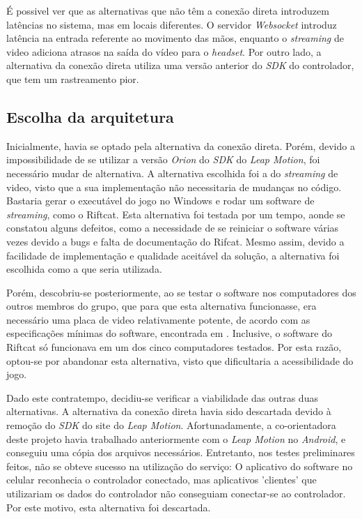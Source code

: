 \begin{quadro}[htb]
	\legend{\fonteAP}
\label{tabela:alternativas-arquiteturas}
\end{quadro}

É possivel ver que as alternativas que não têm a conexão direta introduzem latências no sistema, mas em locais diferentes. O servidor \textit{Websocket} introduz latência na entrada referente ao movimento das mãos, enquanto o \textit{streaming} de video adiciona atrasos na saída do vídeo para o \textit{headset}. Por outro lado, a alternativa da conexão direta utiliza uma versão anterior do \textit{SDK} do controlador, que tem um rastreamento pior.

\subsection{Escolha da arquitetura}\label{subsec-arquitetura-escolha}

Inicialmente, havia se optado pela alternativa da conexão direta. Porém, devido
a impossibilidade de se utilizar a versão \textit{Orion} do \textit{SDK} do 
\textit{Leap Motion}, foi necessário mudar de alternativa. A alternativa 
escolhida foi a do \textit{streaming} de video, visto que a 
sua implementação não necessitaria de mudanças no código. Bastaria gerar 
o executável do jogo no Windows e rodar um software de \textit{streaming}, como o 
Riftcat. Esta alternativa foi testada por um tempo, aonde se constatou
alguns defeitos, como a necessidade de se reiniciar o software várias vezes 
devido a bugs e falta de documentação do Rifcat. Mesmo assim, devido a facilidade
de implementação e qualidade aceitável da solução, a alternativa foi escolhida
como a que seria utilizada.

Porém, descobriu-se posteriormente, ao se testar o software nos computadores
dos outros membros do grupo, que para que esta alternativa funcionasse, 
era necessário uma placa de video relativamente potente, de acordo com 
as especificações mínimas do software, encontrada em
\cite{riftcat:2016:requirements}. Inclusive, o software do Riftcat só 
funcionava em um dos cinco computadores testados. Por esta razão, optou-se 
por abandonar esta alternativa, visto que dificultaria a acessibilidade do jogo.

Dado este contratempo, decidiu-se verificar a viabilidade das outras duas 
alternativas. A alternativa da conexão direta havia sido descartada devido
à remoção do \textit{SDK} do site do \textit{Leap Motion}. 
Afortunadamente, a co-orientadora 
deste projeto havia trabalhado anteriormente com o \textit{Leap Motion} 
no \textit{Android}, e conseguiu uma cópia dos arquivos necessários. 
Entretanto, nos testes preliminares feitos, não se obteve sucesso na 
utilização do serviço: O aplicativo do software no celular reconhecia o 
controlador conectado, mas aplicativos 'clientes' que utilizariam os 
dados do controlador não conseguiam conectar-se ao controlador. Por este 
motivo, esta alternativa foi descartada.

